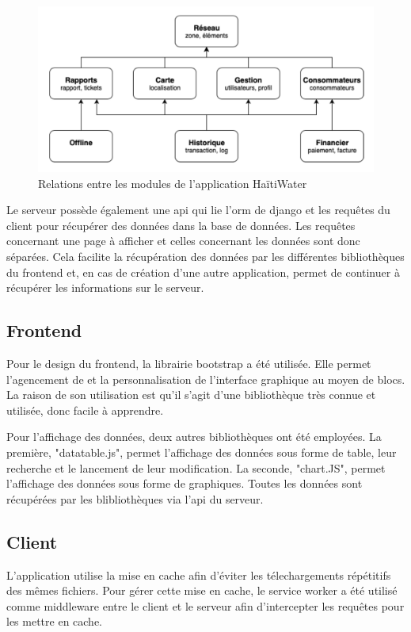 \documentclass{EPL-master-thesis-covers-FR}
\begin{document}
				\begin{figure}[H]
					\centering
					\includegraphics[width=1\textwidth]{images/modules}
					\caption{Relations entre les modules de l'application HaïtiWater}
					\label{fig:modules}
				\end{figure}						
				
				Le serveur possède également une \gls{api} qui lie l'\gls{orm} de \Gls{django} et les requêtes du client pour récupérer des données dans la base de données. Les requêtes concernant une page à afficher et celles concernant les données sont donc séparées. Cela facilite la récupération des données par les différentes bibliothèques du frontend et, en cas de création d'une autre application, permet de continuer à récupérer les informations sur le serveur.
						
			\subsection*{Frontend}
				Pour le design du frontend, la librairie bootstrap a été utilisée. Elle permet l'agencement de et la personnalisation de l'interface graphique au moyen de blocs. La raison de son utilisation est qu'il s'agit d'une bibliothèque très connue et utilisée, donc facile à apprendre.
				
				Pour l'affichage des données, deux autres bibliothèques ont été employées. La première, "datatable.js", permet l'affichage des données sous forme de table, leur recherche et le lancement de leur modification. La seconde, "chart.JS", permet l'affichage des données sous forme de graphiques. Toutes les données sont récupérées par les blibliothèques via l'\gls{api} du serveur.
				
			\subsection*{Client}
				L'application utilise la mise en cache afin d'éviter les télechargements répétitifs des mêmes fichiers. Pour gérer cette mise en cache, le service worker a été utilisé comme \gls{middleware} entre le client et le serveur afin d'intercepter les requêtes pour les mettre en cache.
\end{document}
